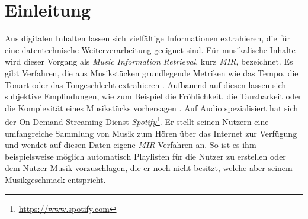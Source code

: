 \section*{Einleitung}
\label{sec:Einleitung}

Aus digitalen Inhalten lassen sich vielfältige Informationen extrahieren, die für eine datentechnische Weiterverarbeitung geeignet sind.
Für musikalische Inhalte wird dieser Vorgang als \textit{Music Information Retrieval}, kurz \textit{MIR}, bezeichnet.
Es gibt Verfahren, die aus Musikstücken grundlegende Metriken wie das Tempo, die Tonart oder das Tongeschlecht extrahieren \cite{Casey2008}.
Aufbauend auf diesen lassen sich subjektive Empfindungen, wie zum Beispiel die Fröhlichkeit, die Tanzbarkeit oder die Komplexität eines Musikstücks vorhersagen \cite{Sturm2013}.
Auf Audio spezialisiert hat sich der On-Demand-Streaming-Dienst \textit{Spotify}\footnote{\url{https://www.spotify.com}}.
Er stellt seinen Nutzern eine umfangreiche Sammlung von Musik zum Hören über das Internet zur Verfügung und wendet auf diesen Daten eigene \textit{MIR} Verfahren an.
So ist es ihm beispielsweise möglich automatisch Playlisten für die Nutzer zu erstellen oder dem Nutzer Musik vorzuschlagen, die er noch nicht besitzt, welche aber seinem Musikgeschmack entspricht.
